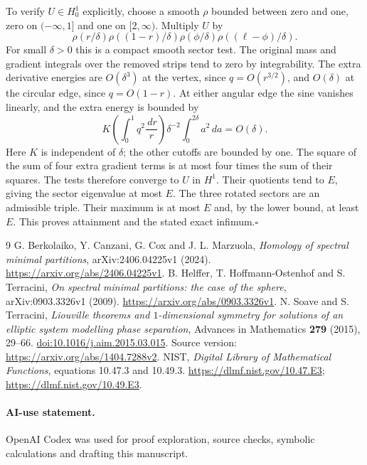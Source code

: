 \documentclass[11pt]{article}
\newcommand{\dd}{\,d}
\begin{document}
To verify $U\in H_0^1$ explicitly, choose a smooth $\rho$ bounded between
zero and one, zero on $(-\infty,1]$ and one on $[2,\infty)$.
Multiply $U$ by
\[
 \rho(r/\delta)\rho((1-r)/\delta)
 \rho(\phi/\delta)\rho((\ell-\phi)/\delta).
\]
For small $\delta>0$ this is a compact smooth sector test.
The original mass and gradient integrals over the removed strips tend to
zero by integrability. The extra derivative energies are $O(\delta^3)$
at the vertex, since $q=O(r^{3/2})$, and $O(\delta)$ at the circular edge,
since $q=O(1-r)$. At either angular edge the sine vanishes linearly,
and the extra energy is bounded by
\[
 K\left(\int_0^1q^2\frac{\dd r}{r}\right)
    \delta^{-2}\int_0^{2\delta}a^2\dd a=O(\delta).
\]
Here $K$ is independent of $\delta$; the other cutoffs are bounded by one.
The square of the sum of four extra gradient terms is at most four times
the sum of their squares. The tests therefore converge to $U$ in $H^1$.
Their quotients tend to $E$, giving the sector eigenvalue at most $E$.
The three rotated sectors are an admissible triple. Their maximum is at
most $E$ and, by the lower bound, at least $E$. This proves attainment and
the stated exact infimum.\hfill$\square$

\begin{thebibliography}{9}
G. Berkolaiko, Y. Canzani, G. Cox and J. L. Marzuola,
\emph{Homology of spectral minimal partitions},
arXiv:2406.04225v1 (2024).
\url{https://arxiv.org/abs/2406.04225v1}.
B. Helffer, T. Hoffmann-Ostenhof and S. Terracini,
\emph{On spectral minimal partitions: the case of the sphere},
arXiv:0903.3326v1 (2009).
\url{https://arxiv.org/abs/0903.3326v1}.
N. Soave and S. Terracini,
\emph{Liouville theorems and $1$-dimensional symmetry for solutions of an
elliptic system modelling phase separation},
Advances in Mathematics \textbf{279} (2015), 29--66.
\href{https://doi.org/10.1016/j.aim.2015.03.015}{doi:10.1016/j.aim.2015.03.015}.
Source version: \url{https://arxiv.org/abs/1404.7288v2}.
NIST, \emph{Digital Library of Mathematical Functions},
equations 10.47.3 and 10.49.3.
\url{https://dlmf.nist.gov/10.47.E3};
\url{https://dlmf.nist.gov/10.49.E3}.
\end{thebibliography}

\paragraph{AI-use statement.}
OpenAI Codex was used for proof exploration, source checks, symbolic
calculations and drafting this manuscript.
\end{document}
